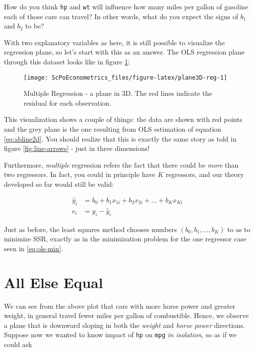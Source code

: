 \documentclass[]{book}
\begin{document}
How do you think \texttt{hp} and \texttt{wt} will influence how many
miles per gallon of gasoline each of those cars can travel? In other
words, what do you expect the signs of \(b_1\) and \(b_2\) to be?

With two explanatory variables as here, it is still possible to
visualize the regression plane, so let's start with this as an answer.
The OLS regression plane through this dataset looks like in figure
\ref{fig:plane3D-reg}:

\begin{figure}

{\centering \texttt{[image: ScPoEconometrics\_files/figure-latex/plane3D-reg-1]} 

}

\caption{Multiple Regression - a plane in 3D. The red lines indicate the residual for each observation.}\label{fig:plane3D-reg}
\end{figure}

This visualization shows a couple of things: the data are shown with red
points and the grey plane is the one resulting from OLS estimation of
equation \eqref{eq:abline2d}. You should realize that this is exactly the
same story as told in figure \ref{fig:line-arrows} - just in three
dimensions!

Furthermore, \emph{multiple} regression refers the fact that there could
be \emph{more} than two regressors. In fact, you could in principle have
\(K\) regressors, and our theory developed so far would still be valid:

\begin{align}
\hat{y}_i &= b_0 + b_1 x_{1i} +   b_2 x_{2i} + \dots + b_K x_{Ki}\\
e_i &= y_i - \hat{y}_i \label{eq:multiple-reg}
\end{align}

Just as before, the least squares method chooses numbers
\((b_0,b_1,\dots,b_K)\) to as to minimize SSR, exactly as in the
minimization problem for the one regressor case seen in
\eqref{eq:ols-min}.

\section{All Else Equal}\label{ceteris}

We can see from the above plot that cars with more horse power and
greater weight, in general travel fewer miles per gallon of combustible.
Hence, we observe a plane that is downward sloping in both the
\emph{weight} and \emph{horse power} directions. Suppose now we wanted
to know impact of \texttt{hp} on \texttt{mpg} \emph{in isolation}, so as
if we could ask
\end{document}
